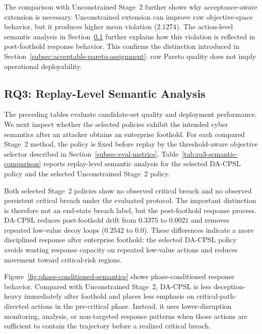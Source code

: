 \documentclass[sigconf,review,anonymous]{acmart}
\begin{document}
The comparison with Unconstrained Stage~2 further shows why
acceptance-aware extension is necessary. Unconstrained extension can
improve raw objective-space behavior, but it produces higher mean
violation (\(2.1274\)). The action-level semantic analysis in
Section~\ref{subsec:results-semantic-analysis} further explains how this
violation is reflected in post-foothold response behavior. This confirms
the distinction introduced in
Section~\ref{subsec:acceptable-pareto-assignment}: raw Pareto quality
does not imply operational deployability.

\subsection{RQ3: Replay-Level Semantic Analysis}
\label{subsec:results-semantic-analysis}
\label{subsec:results-semantic-audit}

The preceding tables evaluate candidate-set quality and deployment
performance. We next inspect whether the selected policies exhibit the
intended cyber semantics after an attacker obtains an enterprise
foothold. For each compared Stage~2 method, the policy is fixed before
replay by the threshold-aware objective selector described in
Section~\ref{subsec:eval-metrics}. Table~\ref{tab:rq3-semantic-comparison}
reports replay-level semantic analysis for the selected DA-CPSL policy
and the selected Unconstrained Stage~2 policy.

\begin{table}[t]
\centering
\small
\caption{Replay-level semantic analysis of selected Stage~2 policies. The table reports critical-breach indicators and post-foothold process diagnostics under the fixed replay protocol.}
\label{tab:rq3-semantic-comparison}

\end{table}

Both selected Stage~2 policies show no observed critical breach and no
observed persistent critical breach under the evaluated protocol. The
important distinction is therefore not an end-state breach label, but the
post-foothold response process. DA-CPSL reduces post-foothold drift from
\(0.3375\) to \(0.0021\) and removes repeated low-value decoy loops
(\(0.2542\) to \(0.0\)). These differences indicate a more disciplined
response after enterprise foothold: the selected DA-CPSL policy avoids
wasting response capacity on repeated low-value actions and reduces
movement toward critical-risk regions.

Figure~\ref{fig:phase-conditioned-semantics} shows phase-conditioned
response behavior. Compared with Unconstrained Stage~2, DA-CPSL is less
deception-heavy immediately after foothold and places less emphasis on
critical-path-directed actions in the pre-critical phase. Instead, it
uses lower-disruption monitoring, analysis, or non-targeted response
patterns when those actions are sufficient to contain the trajectory
before a realized critical breach.
\end{document}
